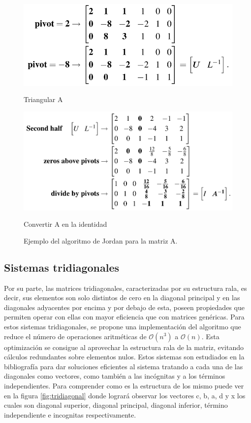 \begin{figure}[H]
    \centering
    \begin{minipage}{0.3\linewidth}
        \includegraphics[width=\linewidth]{img/inversa_1.png}
        \caption{Triangular A}
    \end{minipage}
  \begin{minipage}{0.3\linewidth}
      \includegraphics[width=\linewidth]{img/inversa_2.png}
      \caption{Convertir A en la identidad}
  \end{minipage}
  \caption{Ejemplo del algoritmo de Jordan para la matriz A.}
  \label{fig:jordan_ejemplo}
\end{figure}



\subsection{Sistemas tridiagonales}
\label{sec:tridiagonal}

Por su parte, las matrices tridiagonales, caracterizadas por su estructura rala, es decir, sus elementos son solo distintos de cero en la diagonal principal y en las diagonales adyacentes por encima y por debajo de esta, poseen propiedades que permiten operar con ellas con mayor eficiencia que con matrices genéricas. Para estos sistemas tridiagonales, se propone una implementación del algoritmo que reduce el número de operaciones aritméticas de $\mathcal{O}(n^3)$ a $\mathcal{O}(n)$. Esta optimización se consigue al aprovechar la estructura rala de la matriz, evitando cálculos redundantes sobre elementos nulos. Estos sistemas son estudiados en la bibliografía \cite{Recipes07} para dar soluciones eficientes al sistema tratando a cada una de las diagonales como vectores, como también a las incógnitas y a los términos independientes. Para comprender como es la estructura de los mismo puede ver en la figura \ref{fig:tridiagonal} donde logrará observar los vectores c, b, a, d y x los cuales son diagonal superior, diagonal principal, diagonal inferior, término independiente e incognitas respectivamente.  

